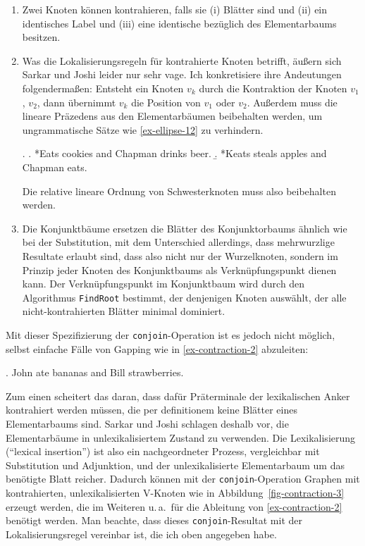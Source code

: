 \begin{enumerate}
  \item Zwei Knoten können kontrahieren, falls sie (i) Blätter sind und (ii) ein identisches Label und (iii) eine identische  bezüglich des Elementarbaums besitzen.
  \item Was die Lokalisierungsregeln für kontrahierte Knoten betrifft, äußern sich Sarkar und Joshi leider nur sehr vage. Ich konkretisiere ihre Andeutungen folgenderma\ss en: Entsteht ein Knoten $v_k$ durch die Kontraktion der Knoten $v_1$, $v_2$, dann übernimmt $v_k$ die Position von $v_1$ oder $v_2$. Au\ss erdem muss die lineare Präzedens aus den Elementarbäumen beibehalten werden, um ungrammatische Sätze wie \ref{ex-ellipse-12} zu verhindern.

\ex.\label{ex-ellipse-12}
\a. *Eats cookies and Chapman drinks beer.
\b. *Keats steals apples and Chapman eats.

Die relative lineare Ordnung von Schwesterknoten muss also beibehalten werden. 
\item Die Konjunktbäume ersetzen die Blätter des Konjunktorbaums ähnlich wie bei der Substitution, mit dem Unterschied allerdings, dass mehrwurzlige Resultate erlaubt sind, dass also nicht nur der Wurzelknoten, sondern im Prinzip jeder Knoten des Konjunktbaums als Verknüpfungspunkt dienen kann. Der Verknüpfungspunkt im Konjunktbaum wird durch den Algorithmus {\tt FindRoot} bestimmt, der denjenigen Knoten auswählt, der alle nicht-kontrahierten Blätter minimal dominiert. 
\end{enumerate} 

Mit dieser Spezifizierung der {\tt conjoin}-Operation ist es jedoch nicht möglich, selbst einfache Fälle von Gapping wie in \ref{ex-contraction-2} abzuleiten:

\ex. \label{ex-contraction-2}John ate bananas and Bill strawberries. 

Zum einen scheitert das daran, dass dafür Präterminale der lexikalischen Anker kontrahiert werden müssen, die per definitionem keine Blätter eines Elementarbaums sind. Sarkar und Joshi schlagen deshalb vor, die Elementarbäume in unlexikalisiertem Zustand zu verwenden. Die Lexikalisierung ("`lexical insertion"') ist also ein nachgeordneter Prozess, vergleichbar mit Substitution und Adjunktion, und der unlexikalisierte Elementarbaum um das benötigte Blatt reicher. Dadurch können mit der {\tt conjoin}-Operation Graphen mit kontrahierten, unlexikalisierten V-Knoten wie in Abbildung~\ref{fig-contraction-3} erzeugt werden, die im Weiteren u.\,a.\ für die Ableitung von \ref{ex-contraction-2} benötigt werden. Man beachte, dass dieses {\tt conjoin}-Resultat mit der Lokalisierungsregel vereinbar ist, die ich oben angegeben habe.

